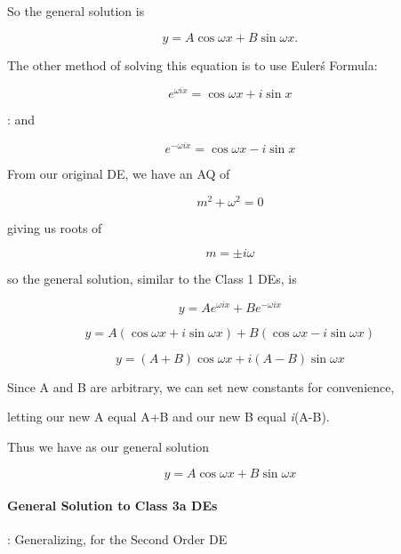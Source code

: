 So the general solution is



$$y=A\cos \omega x+B\sin \omega x. \,$$



The other method of solving this equation is to use Euler\'s Formula:



$$e^{\omega ix}=\cos \omega x +i \sin x \,$$



:   and



$$e^{-\omega ix}=\cos \omega x -i \sin x \,$$



From our original DE, we have an AQ of



$$m^2+\omega^2=0 \,$$



giving us roots of



$$m=\pm i \omega \,$$



so the general solution, similar to the Class 1 DEs, is



$$y=Ae^{\omega ix}+Be^{-\omega ix} \,$$



$$y=A(\cos \omega x +i \sin \omega x)+B(\cos \omega x -i \sin \omega x)\,$$



$$y=(A+B)\cos \omega x+i(A-B)\sin \omega x \,$$



Since A and B are arbitrary, we can set new constants for convenience,

letting our new A equal A+B and our new B equal \textit{i}(A-B).



Thus we have as our general solution



$$y=A\cos \omega x+B\sin \omega x \,$$



\paragraph{General Solution to Class 3a DEs}



:   Generalizing, for the Second Order DE



